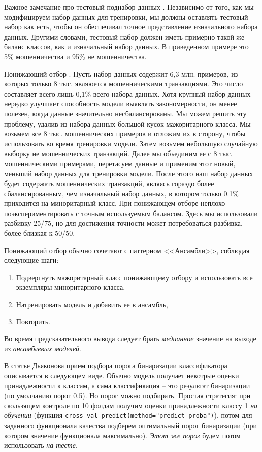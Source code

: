 \documentclass[%
	11pt,
	a4paper,
	utf8,
		]{article}
\begin{document}
Важное замечание про тестовый поднабор данных \cite[]{lakshmanan-mldp:2022}. Независимо от того, как мы модифицируем набор данных для тренировки, мы должны оставлять тестовый набор как есть, чтобы он обеспечивал точное представление изначального набора данных. Другими словами, тестовый набор должен иметь примерно такой же баланс классов, как и изначальный набор данных. В приведенном примере это 5\% мошенничества и 95\% не мошенничества.

Понижающий отбор \cite[]{lakshmanan-mldp:2022}. Пусть набор данных содержит 6,3 млн. примеров, из которых только 8 тыс. являюется мошенническими транзакциями. Это число составляет всего лишь 0,1\% всего набора данных. Хотя крупный набор данных нередко улучшает способность модели выявлять закономерности, он менее полезен, когда данные значительно несбалансированы. Мы можем решить эту проблему, удалив из набора данных большой кусок мажоритарного класса. Мы возьмем все 8 тыс. мошеннических примеров и отложим их в сторону, чтобы использовать во время тренировки модели. Затем возьмем небольшую случайную выборку не мошеннических транзакций. Далее мы объединим ее с 8 тыс. мошенническими примерами, перетасуем данные и применим этот новый, меньший набор данных для тренировки модели. После этого наш набор данных будет содержать мошеннических транзакций, являясь гораздо более сбалансированным, чем изначальный набор данных, в котором только 0.1\% приходится на миноритарный класс. При понижающем отборе неплохо поэкспериментировать с точным используемым балансом. Здесь мы использовали разбивку 25/75, но для достижения точности может потребоваться разбивка, более близкая к 50/50.

Понижающий отбор обычно сочетают с паттерном <<Ансамбли>>, соблюдая следующие шаги:
\begin{enumerate}
	\item Подвергнуть мажоритарный класс понижающему отбору и использовать все экземпляры миноритарного класса,
	
	\item Натренировать модель и добавить ее в ансамбль,
	
	\item Повторить.
\end{enumerate}

Во время предсказательного вывода следует брать \emph{медианное} значение на выходе из \emph{ансамблевых моделей}.

В статье Дьяконова прием подбора порога бинаризации классификатора описывается в следующем виде. Обычно модель получает некотрые оценки принадлежности к классам, а сама классификация -- это результат бинаризации (по умолчанию порог 0.5). Но порог можно подбирать. Простая стратегия: при скользящем контроле по 10 фолдам получим оценки принадлежности классу 1 \emph{на обучении} (функция \texttt{cross\_val\_predict(method="predict\_proba")}), потом для заданного функционала качества подберем оптимальный порог бинаризации (при котором значение функционала максимально). \emph{Этот же порог} будем потом использовать \emph{на тесте}.
\end{document}
